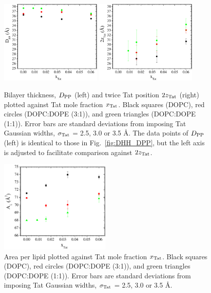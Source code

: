 \begin{figure}[htbp]
  \centering
  \includegraphics[width=0.45\textwidth]{figures/Tat/SDP_Results/DPP2}
  \qquad
  \includegraphics[width=0.45\textwidth]{figures/Tat/SDP_Results/2zTat}
  \caption{Bilayer thickness, $D_\textrm{PP}$ (left) and twice Tat position $2z_\textrm{Tat}$ (right)
  plotted against Tat mole fraction $x_\textrm{Tat}$.
  Black squares (DOPC), red circles (DOPC:DOPE (3:1)), and green
  triangles (DOPC:DOPE (1:1)).
  Error bars are standard deviations from imposing Tat Gaussian widths, 
  $\sigma_\textrm{Tat}$ = 2.5, 3.0 or 3.5 \AA. The data points of $D_\textrm{PP}$ (left) is 
  identical to those in Fig.~\ref{fig:DHH_DPP}, but the left axis is adjusted
  to facilitate comparison against $2z_\textrm{Tat}$.}
  \label{fig:DPP_2zTat}
\end{figure}

\begin{figure}[htbp]
  \centering
  \includegraphics[width=0.49\textwidth]{figures/Tat/SDP_Results/AL}
  \caption{Area per lipid plotted against Tat mole fraction $x_\textrm{Tat}$.
  Black squares (DOPC), red circles (DOPC:DOPE (3:1)), and green
  triangles (DOPC:DOPE (1:1)).
  Error bars are standard deviations from imposing Tat Gaussian widths, 
  $\sigma_\textrm{Tat}$ = 2.5, 3.0 or 3.5 \AA.}
  \label{fig:AL}
\end{figure}

